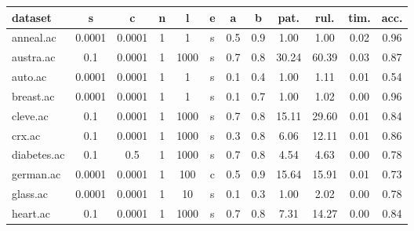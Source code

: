 \begin{table}[htbp]
	\centering
		\begin{tabular}{|l|c|c|c|c|c|c|c||c|c|c|c|}
		\hline
		\textbf{dataset}	& \textbf{s}	& \textbf{c}	& \textbf{n}	& \textbf{l}	& \textbf{e} & \textbf{a} & \textbf{b} & \textbf{pat.}	& \textbf{rul.}	& \textbf{tim.}	& \textbf{acc.}	\\
		\hline
		anneal.ac      & 0.0001   & 0.0001      & 1              & 1                   & s        & 0.5    & 0.9   & 1.00           & 1.00           & 0.02           & 0.96           \\
		\hline
		austra.ac      & 0.1      & 0.0001      & 1              & 1000                & s        & 0.7    & 0.8   & 30.24          & 60.39          & 0.03           & 0.87           \\
		\hline
		auto.ac        & 0.0001   & 0.0001      & 1              & 1                   & s        & 0.1    & 0.4   & 1.00           & 1.11           & 0.01           & 0.54           \\
		\hline
		breast.ac      & 0.0001   & 0.0001      & 1              & 1                   & s        & 0.1    & 0.7   & 1.00           & 1.02           & 0.00           & 0.96           \\
		\hline
		cleve.ac       & 0.1      & 0.0001      & 1              & 1000                & s        & 0.7    & 0.8   & 15.11          & 29.60          & 0.01           & 0.84           \\
		\hline
		crx.ac         & 0.1      & 0.0001      & 1              & 1000                & s        & 0.3    & 0.8   & 6.06           & 12.11          & 0.01           & 0.86           \\
		\hline
		diabetes.ac    & 0.1      & 0.5         & 1              & 1000                & s        & 0.7    & 0.8   & 4.54           & 4.63           & 0.00           & 0.78           \\
		\hline
		german.ac      & 0.0001   & 0.0001      & 1              & 100                 & c        & 0.5    & 0.9   & 15.64          & 15.91          & 0.01           & 0.73           \\
		\hline
		glass.ac       & 0.0001   & 0.0001      & 1              & 10                  & s        & 0.1    & 0.3   & 1.00           & 2.02           & 0.00           & 0.78           \\
		\hline
		heart.ac       & 0.1      & 0.0001      & 1              & 1000                & s        & 0.7    & 0.8   & 7.31           & 14.27          & 0.00           & 0.84           \\

\end{tabular}
\end{table}
